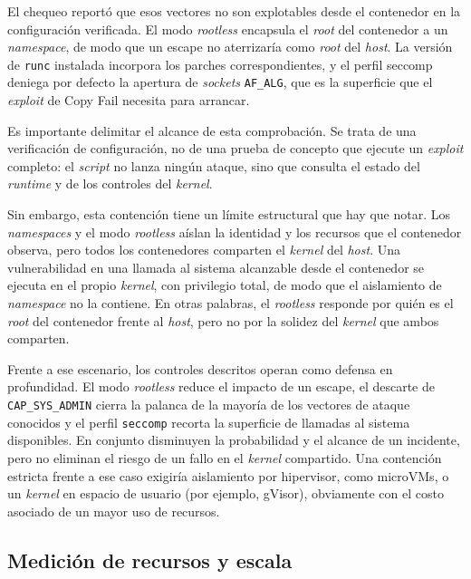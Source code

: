 El chequeo reportó que esos vectores no son explotables desde el contenedor en
la configuración verificada. El modo \textit{rootless} encapsula el
\textit{root} del contenedor a un \textit{namespace}, de modo que un
escape no aterrizaría como \textit{root} del \textit{host}. La versión de
\texttt{runc} instalada incorpora los parches correspondientes, y el perfil
seccomp deniega por defecto la apertura de \textit{sockets} \texttt{AF\_ALG},
que es la
superficie que el \textit{exploit} de Copy Fail necesita para arrancar.

Es importante delimitar el alcance de esta comprobación. Se trata de una
verificación de configuración, no de una prueba de concepto que
ejecute un \textit{exploit} completo: el \textit{script} no lanza ningún ataque,
sino que consulta el estado del \textit{runtime} y de los controles del \textit{kernel}.

Sin embargo, esta contención tiene un límite estructural que hay que notar. Los \textit{namespaces} y el modo \textit{rootless} aíslan la
identidad y los recursos que el contenedor observa, pero todos los
contenedores comparten el \textit{kernel} del \textit{host}. Una
vulnerabilidad en una llamada al sistema alcanzable desde el contenedor se
ejecuta en el propio \textit{kernel}, con privilegio total, de modo que el
aislamiento de \textit{namespace} no la contiene. En otras palabras, el
\textit{rootless} responde por quién es el \textit{root} del contenedor frente
al \textit{host}, pero no por la solidez del \textit{kernel} que ambos
comparten.

Frente a ese escenario, los controles descritos operan como defensa en
profundidad. El modo \textit{rootless} reduce el impacto de un escape, el
descarte de \texttt{CAP\_SYS\_ADMIN} cierra la palanca de la mayoría de los
vectores de ataque conocidos y el perfil \texttt{seccomp} recorta la superficie de llamadas al
sistema disponibles. En conjunto disminuyen la probabilidad y el alcance de un
incidente, pero no eliminan el riesgo de un fallo en el \textit{kernel}
compartido. Una contención estricta frente a ese caso exigiría aislamiento por
hipervisor, como microVMs, o un \textit{kernel} en espacio de usuario (por
ejemplo, gVisor), obviamente con el costo asociado de un mayor uso de
recursos.

\subsection{Medición de recursos y escala}
\label{sec:medicion-recursos}

